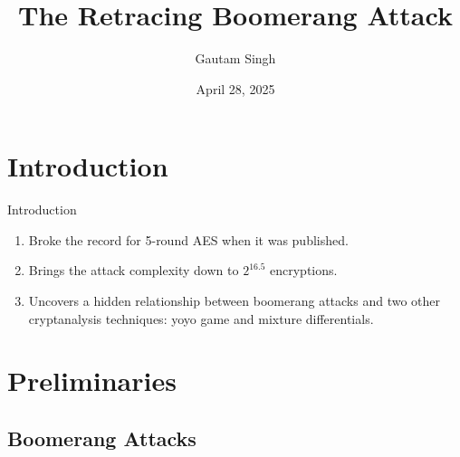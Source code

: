 \documentclass[notheorems]{beamer}
\title{The Retracing Boomerang Attack}
\date{April 28, 2025}
\author{Gautam Singh}
\institute[IITH]{Indian Institute of Technology Hyderabad}
\theoremstyle{definition}
\theoremstyle{example}
\begin{document}
    
    \begin{frame}
        \titlepage
    \end{frame}
    
    \begin{frame}
        \tableofcontents[hideallsubsections]
    \end{frame}
    
    \section{Introduction}
    \label{sec:intro}
    
    \begin{frame}[<+->]{Introduction}
        \begin{enumerate}
            \item Broke the record for 5-round AES when it was
            published.
            \item Brings the attack complexity down to \(2^{16.5}\)
            encryptions.
            \item Uncovers a hidden relationship between boomerang attacks and
            two other cryptanalysis techniques: yoyo game and mixture
            differentials.
        \end{enumerate}
    \end{frame}

    \section{Preliminaries}
    \label{sec:prelims}

    \subsection{Boomerang Attacks}
    \label{subsec:boomerang}
\end{document}
